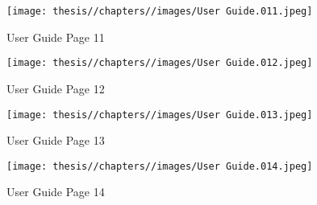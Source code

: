 \begin{figure} [H]
    \centering
    \texttt{[image: thesis//chapters//images/User Guide.011.jpeg]}
    \caption{User Guide Page 11}
     \label{fig:ug11}
\end{figure}

\begin{figure} [H]
    \centering
    \texttt{[image: thesis//chapters//images/User Guide.012.jpeg]}
    \caption{User Guide Page 12}
     \label{fig:ug12}
\end{figure}

\begin{figure} [H]
    \centering
    \texttt{[image: thesis//chapters//images/User Guide.013.jpeg]}
    \caption{User Guide Page 13}
     \label{fig:ug13}
\end{figure}

\begin{figure} [H]
    \centering
    \texttt{[image: thesis//chapters//images/User Guide.014.jpeg]}
    \caption{User Guide Page 14}
     \label{fig:ug14}
\end{figure}

